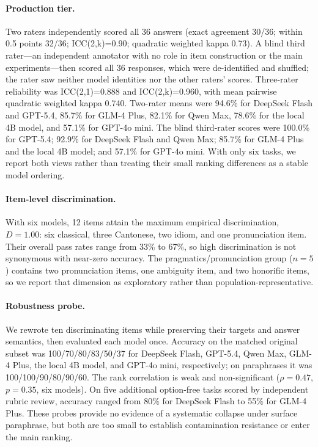 \documentclass[11pt]{article}
\begin{document}
\paragraph{Production tier.} Two raters independently scored all 36 answers (exact agreement 30/36; within 0.5 points 32/36; ICC(2,k)=0.90; quadratic weighted kappa 0.73). A blind third rater---an independent annotator with no role in item construction or the main experiments---then scored all 36 responses, which were de-identified and shuffled; the rater saw neither model identities nor the other raters' scores. Three-rater reliability was ICC(2,1)=0.888 and ICC(2,k)=0.960, with mean pairwise quadratic weighted kappa 0.740. Two-rater means were 94.6\% for DeepSeek Flash and GPT-5.4, 85.7\% for GLM-4 Plus, 82.1\% for Qwen Max, 78.6\% for the local 4B model, and 57.1\% for GPT-4o mini. The blind third-rater scores were 100.0\% for GPT-5.4; 92.9\% for DeepSeek Flash and Qwen Max; 85.7\% for GLM-4 Plus and the local 4B model; and 57.1\% for GPT-4o mini. With only six tasks, we report both views rather than treating their small ranking differences as a stable model ordering.

\paragraph{Item-level discrimination.} With six models, 12 items attain the maximum empirical discrimination, $D{=}1.00$: six classical, three Cantonese, two idiom, and one pronunciation item. Their overall pass rates range from 33\% to 67\%, so high discrimination is not synonymous with near-zero accuracy. The pragmatics/pronunciation group ($n{=}5$) contains two pronunciation items, one ambiguity item, and two honorific items, so we report that dimension as exploratory rather than population-representative.

\paragraph{Robustness probe.} We rewrote ten discriminating items while preserving their targets and answer semantics, then evaluated each model once. Accuracy on the matched original subset was 100/70/80/83/50/37 for DeepSeek Flash, GPT-5.4, Qwen Max, GLM-4 Plus, the local 4B model, and GPT-4o mini, respectively; on paraphrases it was 100/100/90/80/90/60. The rank correlation is weak and non-significant ($\rho{=}0.47$, $p{=}0.35$, six models). On five additional option-free tasks scored by independent rubric review, accuracy ranged from 80\% for DeepSeek Flash to 55\% for GLM-4 Plus. These probes provide no evidence of a systematic collapse under surface paraphrase, but both are too small to establish contamination resistance or enter the main ranking.
\end{document}
